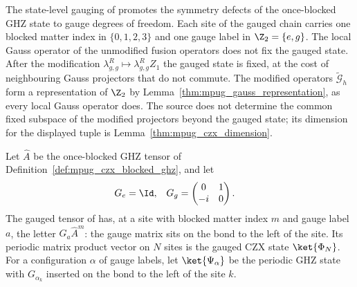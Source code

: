 The state-level gauging of \cite[lines~5121--5183]{FrancoRubio2025MPUGauging}
promotes the symmetry defects of the once-blocked GHZ state to gauge degrees of
freedom. Each site of the gauged chain carries one blocked matter index in
$\{0,1,2,3\}$ and one gauge label in $\Z_2=\{e,g\}$. The local Gauss operator
of the unmodified fusion operators does not fix the gauged state. After the
modification $\lambda^R_{g,g}\mapsto\lambda^R_{g,g}Z_1$ the gauged state is
fixed, at the cost of neighbouring Gauss projectors that do not commute. The
modified operators $\widetilde{\mathcal G}_h$ form a representation of $\Z_2$
by Lemma~\ref{thm:mpug_gauss_representation}, as every local Gauss operator
does. The source does not determine the common fixed subspace of the modified
projectors beyond the gauged state; its dimension for the displayed tuple is
Lemma~\ref{thm:mpug_czx_dimension}.

\begin{definition}
    \label{def:mpug_czx_gauged_tensor}
    \leanok
    Let $\widehat A$ be the once-blocked GHZ tensor of
    Definition~\ref{def:mpug_czx_blocked_ghz}, and let
    \begin{align}
        G_e & =\Id,                                   &
        G_g & =\begin{pmatrix}0&1\\-i&0\end{pmatrix}.
        \label{eq:mpug_czx_gauge_matrices}
    \end{align}
    The gauged tensor of \cite[lines~5129--5178]{FrancoRubio2025MPUGauging}
    has, at a site with blocked matter index $m$ and gauge label $a$, the
    letter $G_a\widehat A^m$: the gauge matrix sits on the bond to the left of
    the site. Its periodic matrix product vector on $N$ sites is the gauged
    CZX state $\ket{\Phi_N}$. For a configuration $\alpha$ of gauge labels, let
    $\ket{\Psi_\alpha}$ be the periodic GHZ state with $G_{\alpha_k}$ inserted
    on the bond to the left of the site $k$.
\end{definition}

